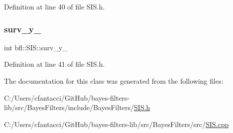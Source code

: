 Definition at line 40 of file S\+I\+S.\+h.

\mbox{\label{classbfl_1_1SIS_af39569c2ba7035387556e8a31ca633e8}} 
\subsubsection{\texorpdfstring{surv\+\_\+y\+\_\+}{surv\_y\_}}
{\footnotesize\ttfamily int bfl\+::\+S\+I\+S\+::surv\+\_\+y\+\_\+\hspace{0.3cm}{\ttfamily [protected]}}



Definition at line 41 of file S\+I\+S.\+h.



The documentation for this class was generated from the following files\+:\begin{DoxyCompactItemize}
\item 
C\+:/\+Users/cfantacci/\+Git\+Hub/bayes-\/filters-\/lib/src/\+Bayes\+Filters/include/\+Bayes\+Filters/\mbox{\hyperlink{SIS_8h}{S\+I\+S.\+h}}\item 
C\+:/\+Users/cfantacci/\+Git\+Hub/bayes-\/filters-\/lib/src/\+Bayes\+Filters/src/\mbox{\hyperlink{SIS_8cpp}{S\+I\+S.\+cpp}}\end{DoxyCompactItemize}
